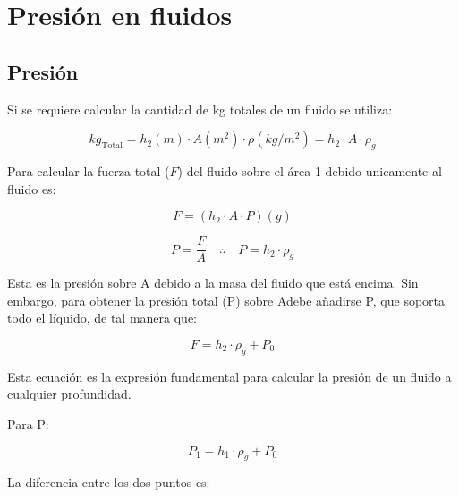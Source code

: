 \documentclass{AsignaturaResumen}
\begin{document}
    \chapter{Presión en fluidos}
\fi




\section{Presión}\label{sec:presion}

Si se requiere calcular la cantidad de kg totales de un fluido se utiliza:

\begin{equation*}
    kg_{\text{Total}} = h_{2}(m) \cdot A(m^{2}) \cdot \rho(kg/m^{2}) = h_{2} \cdot A \cdot \rho_{g} 
\end{equation*}

Para calcular la fuerza total ($F$) del fluido sobre el área 1 debido unicamente al fluido es:

\begin{equation}
    F = (h_{2} \cdot A \cdot P)(g)
\end{equation}

\begin{equation}
    P = \frac{F}{A} \quad\therefore\quad P = h_{2} \cdot \rho_{g}
\end{equation}

Esta es la presión sobre A debido a la masa del fluido que está encima. Sin embargo, para obtener la presión total (P) sobre Adebe añadirse P, que soporta todo el líquido, de tal manera que:

\begin{equation}
    F = h_{2} \cdot \rho_{g} + P_{0}
\end{equation}

Esta ecuación es la expresión fundamental para calcular la presión de un fluido a cualquier profundidad.

Para P:

\begin{equation}
    P_{1} = h_{1} \cdot \rho_{g} + P_{0}
\end{equation}

La diferencia entre los dos puntos es:
\end{document}
